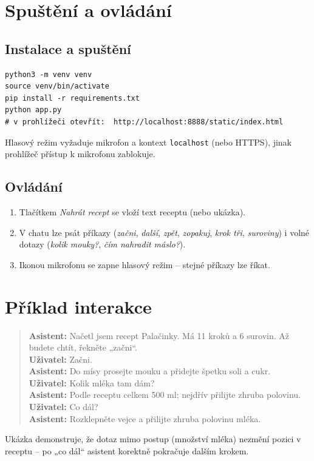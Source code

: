 \documentclass[11pt,a4paper]{article}
\begin{document}
\section{Spuštění a ovládání}
\subsection{Instalace a spuštění}
\begin{lstlisting}[caption={Instalace závislostí a spuštění serveru.}]
python3 -m venv venv
source venv/bin/activate
pip install -r requirements.txt
python app.py
# v prohlížeči otevřít:  http://localhost:8888/static/index.html
\end{lstlisting}
Hlasový režim vyžaduje mikrofon a kontext \texttt{localhost} (nebo HTTPS), jinak
prohlížeč přístup k mikrofonu zablokuje.

\subsection{Ovládání}
\begin{enumerate}[noitemsep]
  \item Tlačítkem \emph{Nahrát recept} se vloží text receptu (nebo ukázka).
  \item V chatu lze psát příkazy (\emph{začni}, \emph{další}, \emph{zpět},
        \emph{zopakuj}, \emph{krok tři}, \emph{suroviny}) i volné dotazy
        (\emph{kolik mouky?}, \emph{čím nahradit máslo?}).
  \item Ikonou mikrofonu se zapne hlasový režim -- stejné příkazy lze říkat.
\end{enumerate}

\section{Příklad interakce}
\begin{quote}\small
\textbf{Asistent:} Načetl jsem recept Palačinky. Má 11 kroků a 6 surovin. Až budete
chtít, řekněte „začni``.\\
\textbf{Uživatel:} Začni.\\
\textbf{Asistent:} Do mísy prosejte mouku a přidejte špetku soli a cukr.\\
\textbf{Uživatel:} Kolik mléka tam dám?\\
\textbf{Asistent:} Podle receptu celkem 500 ml; nejdřív přilijte zhruba polovinu.\\
\textbf{Uživatel:} Co dál?\\
\textbf{Asistent:} Rozklepněte vejce a přilijte zhruba polovinu mléka.
\end{quote}
Ukázka demonstruje, že dotaz mimo postup (množství mléka) nezmění pozici v receptu --
po „co dál`` asistent korektně pokračuje dalším krokem.
\end{document}

